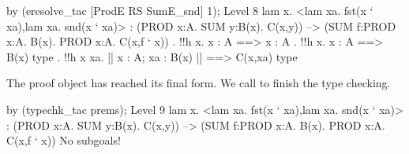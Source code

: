 \begin{ttbox}
by (eresolve_tac [ProdE RS SumE_snd] 1);
{\out Level 8}
{\out lam x. <lam xa. fst(x ` xa),lam xa. snd(x ` xa)>}
{\out : (PROD x:A. SUM y:B(x). C(x,y)) -->}
{\out   (SUM f:PROD x:A. B(x). PROD x:A. C(x,f ` x))}
\ttbreak
{. !!h x. x : A ==> x : A}
{. !!h x. x : A ==> B(x) type}
{. !!h x xa. [| x : A; xa : B(x) |] ==> C(x,xa) type}
\end{ttbox}
The proof object has reached its final form.  We call 
to finish the type checking.
\begin{ttbox}
by (typechk_tac prems);
{\out Level 9}
{\out lam x. <lam xa. fst(x ` xa),lam xa. snd(x ` xa)>}
{\out : (PROD x:A. SUM y:B(x). C(x,y)) -->}
{\out   (SUM f:PROD x:A. B(x). PROD x:A. C(x,f ` x))}
{\out No subgoals!}
\end{ttbox}
